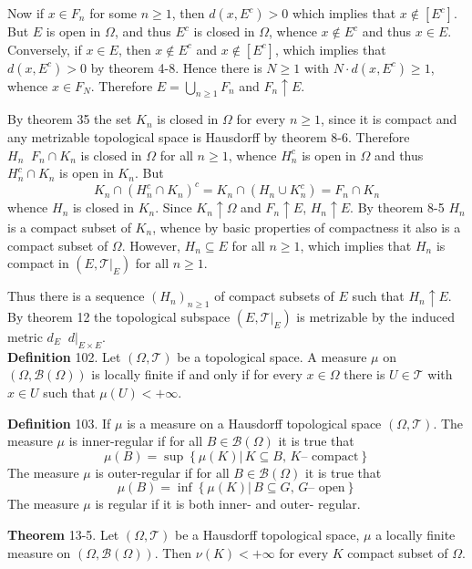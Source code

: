 \documentclass[a4paper]{article}
\newcommand{\obj}[1]{\left\{ #1 \right \}}
\newcommand{\clo}[1]{\left [ #1 \right ]}
\newcommand{\brac}[1]{\left ( #1 \right )}
\newcommand{\induc}[1]{\left . #1 \right \vert}
\newcommand{\Tcal}{\mathcal{T}}
\newcommand{\borel}[1]{\mathcal{B}\brac{#1}}
\newcommand{\defn}{\mathop{\overset{\Delta}{=}}\nolimits}
\begin{document}
Now if $x\in F_n$ for some $n\geq1$, then $d\brac{x,E^c}>0$ which implies that $x\notin \clo{E^c}$. But $E$ is open in $\Omega$, and thus $E^c$ is closed in $\Omega$, whence $x\notin E^c$ and thus $x\in E$. Conversely, if $x\in E$, then $x\notin E^c$ and $x\notin \clo{E^c}$, which implies that $d\brac{x,E^c}>0$ by theorem 4-8. Hence there is $N\geq1$ with $N\cdot d\brac{x,E^c}\geq 1$, whence $x\in F_N$. Therefore $E = \bigcup_{n\geq1} F_n$ and $F_n\uparrow E$.

By theorem 35 the set $K_n$ is closed in $\Omega$ for every $n\geq1$, since it is compact and any metrizable topological space is Hausdorff by theorem 8-6. Therefore $H_n\defn F_n\cap K_n$ is closed in $\Omega$ for all $n\geq1$, whence $H_n^c$ is open in $\Omega$ and thus $H_n^c\cap K_n$ is open in $K_n$. But \[K_n\cap \brac{H_n^c\cap K_n}^c = K_n\cap \brac{H_n\cup K_n^c} = F_n\cap K_n\] whence $H_n$ is closed in $K_n$. Since $K_n\uparrow \Omega$ and $F_n\uparrow E$, $H_n\uparrow E$. By theorem 8-5 $H_n$ is a compact subset of $K_n$, whence by basic properties of compactness it also is a compact subset of $\Omega$. However, $H_n\subseteq E$ for all $n\geq1$, which implies that $H_n$ is compact in $\brac{E,\induc{\Tcal}_E}$ for all $n\geq1$.

Thus there is a sequence $\brac{H_n}_{n\geq1}$ of compact subsets of $E$ such that $H_n\uparrow E$. By theorem 12 the topological subspace $\brac{E,\induc{\Tcal}_E}$ is metrizable by the induced metric $d_E\defn \induc{d}_{E\times E}$.\\

\noindent \textbf{Definition} 102.
Let $\brac{\Omega,\Tcal}$ be a topological space. A measure $\mu$ on $\brac{\Omega,\borel{\Omega}}$ is locally finite if and only if for every $x\in \Omega$ there is $U\in \Tcal$ with $x\in U$ such that $\mu\brac{U}<+\infty$.

\noindent \textbf{Definition} 103.
If $\mu$ is a measure on a Hausdorff topological space $\brac{\Omega,\Tcal}$. The measure $\mu$ is inner-regular if for all $B\in\borel{\Omega}$ it is true that \[\mu\brac{B}=\sup\obj{\induc{\mu\brac{K}}\,K\subseteq B,\,K\text{-- compact}}\] The measure $\mu$ is outer-regular if for all $B\in\borel{\Omega}$ it is true that \[\mu\brac{B}=\inf\obj{\induc{\mu\brac{K}}\,B\subseteq G,\,G\text{-- open}}\] The measure $\mu$ is regular if it is both inner- and outer- regular.


\label{thm:compact_meas_finite} \noindent \textbf{Theorem} 13-5.
Let $\brac{\Omega, \Tcal}$ be a Hausdorff topological space, $\mu$ a locally finite measure on $\brac{\Omega,\borel{\Omega}}$. Then $\nu\brac{K}<+\infty$ for every $K$ compact subset of $\Omega$. 
\end{document}
